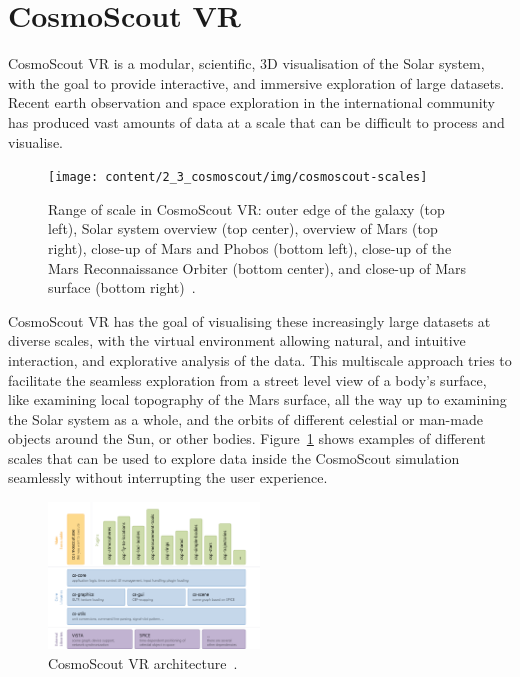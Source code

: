 \section{CosmoScout VR}\label{sec:cosmoscout-vr}

CosmoScout VR is a modular, scientific, 3D visualisation of the Solar system, with the goal to provide interactive,
and immersive exploration of large datasets.
Recent earth observation and space exploration in the international community has produced vast amounts of data at a
scale that can be difficult to process and visualise.

\begin{figure}[h]
    \centering
    \texttt{[image: content/2\_3\_cosmoscout/img/cosmoscout-scales]}
    \caption{Range of scale in CosmoScout VR: outer edge of the galaxy (top left), Solar system overview (top center),
        overview of Mars (top right), close-up of Mars and Phobos (bottom left), close-up of the Mars Reconnaissance
        Orbiter (bottom center), and close-up of Mars surface (bottom right)~\cite{DLRmagazin2019}.}
    \label{fig:cosmoscout-scales}
\end{figure}

CosmoScout VR has the goal of visualising these increasingly large datasets at diverse scales, with the virtual
environment allowing natural, and intuitive interaction, and explorative analysis of the data.
This multiscale approach tries to facilitate the seamless exploration from a street level view of a body's surface,
like examining local topography of the Mars surface, all the way up to examining the
Solar system as a whole, and the orbits of different celestial or man-made objects around the Sun, or other bodies.
Figure~\ref{fig:cosmoscout-scales} shows examples of different scales that can be used to explore data inside the
CosmoScout simulation seamlessly without interrupting the user experience.

\begin{figure}
    \centering
    \includegraphics[width=0.5\textwidth]{content/2_3_cosmoscout/img/cosmoscout-architecture}
    \caption{CosmoScout VR architecture~\cite{CSVR}.}
    \label{fig:cosmoscout-architecture}
\end{figure}

